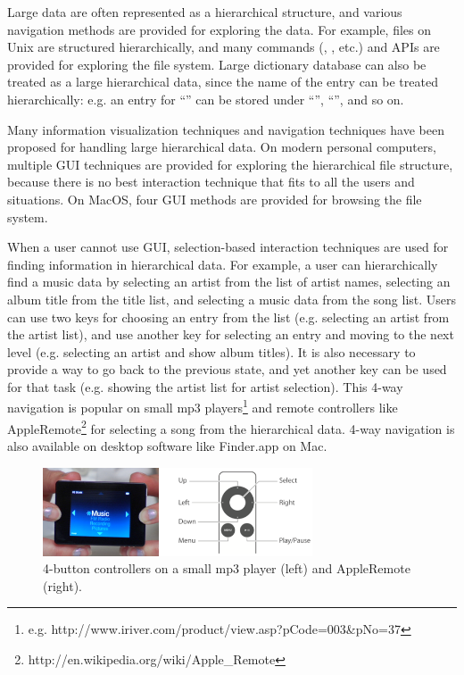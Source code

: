 \documentclass{article}
\begin{document}
Large data are often represented as a hierarchical structure, and
various navigation methods are provided for exploring the data.
For example, files on Unix are structured hierarchically, and
many commands (, , etc.) and APIs are provided for exploring the file system.
Large dictionary database can also be treated as a large
hierarchical data, since the name of the entry can be treated hierarchically:
e.g. an entry for ``'' can be stored under ``'', ``'', and so on.

Many information visualization techniques and navigation techniques
have been proposed for handling large hierarchical data.
On modern personal computers,
multiple GUI techniques are provided for
exploring the hierarchical file structure, because
there is no best interaction technique that fits to all the users and situations.
On MacOS, four GUI methods are provided for browsing the file system.


When a user cannot use GUI,
selection-based interaction techniques are used for
finding information in hierarchical data.
For example, a user can hierarchically find a music data by
selecting an artist from the list of artist names,
selecting an album title from the title list,
and selecting a music data from the song list.
Users can use two keys for choosing an entry from the list
(e.g. selecting an artist from the artist list),
and use another key for selecting an entry and moving to the next level
(e.g. selecting an artist and show album titles).
It is also necessary to provide a way to go back to the previous state, and
yet another key can be used for that task
(e.g. showing the artist list for artist selection).
This 4-way navigation is popular on small mp3 players\footnote{
  e.g. \textsf{http://www.iriver.com/product/view.asp?pCode=003\&pNo=37}
} and remote controllers like AppleRemote\footnote{\textsf{http://en.wikipedia.org/wiki/Apple\_Remote}}
for selecting a song from the hierarchical data.
4-way navigation is also available on desktop software like Finder.app on Mac.


\begin{figure}[H]
\centerline{\includegraphics[width=80mm,bb=0 0 547 179]{figures/4buttons.png}}
\caption{4-button controllers on a small mp3 player (left) and AppleRemote (right).}
\label{u10}
\end{figure}
\end{document}

